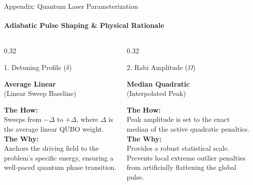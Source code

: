 \documentclass[10pt, aspectratio=169]{beamer}
\begin{document}
\begin{frame}{Appendix: Quantum Laser Parameterization}
    \framesubtitle{Adiabatic Pulse Shaping \& Physical Rationale}
    
    \vspace{0.2cm}
    
    \begin{columns}[T]
        
        \begin{column}{0.32\textwidth}
            \begin{block}{1. Detuning Profile ($\delta$)}
                \begin{minipage}[t][5.5cm][t]{\linewidth}
                    \vspace{0.2cm}
                    \centering
                    {\large \textbf{Average Linear}}\\[0.1cm]
                    \footnotesize (Linear Sweep Baseline)
                    \vspace{0.3cm}
                    
                    \raggedright
                    \small
                    \textbf{The How:}\\ Sweeps from $-\Delta$ to $+\Delta$, where $\Delta$ is the average linear QUBO weight.\\[0.2cm]
                    \textbf{The Why:}\\ Anchors the driving field to the problem's specific energy, ensuring a well-paced quantum phase transition.
                \end{minipage}
            \end{block}
        \end{column}
        
        \begin{column}{0.32\textwidth}
            \begin{block}{2. Rabi Amplitude ($\Omega$)}
                \begin{minipage}[t][5.5cm][t]{\linewidth}
                    \vspace{0.2cm}
                    \centering
                    {\large \textbf{Median Quadratic}}\\[0.1cm]
                    \footnotesize (Interpolated Peak)
                    \vspace{0.3cm}
                    
                    \raggedright
                    \small
                    \textbf{The How:}\\ Peak amplitude is set to the exact median of the active quadratic penalties.\\[0.2cm]
                    \textbf{The Why:}\\ Provides a robust statistical scale. Prevents local extreme outlier penalties from artificially flattening the global pulse.
                \end{minipage}
            \end{block}
        \end{column}
        

\end{columns}
\end{frame}
\end{document}
